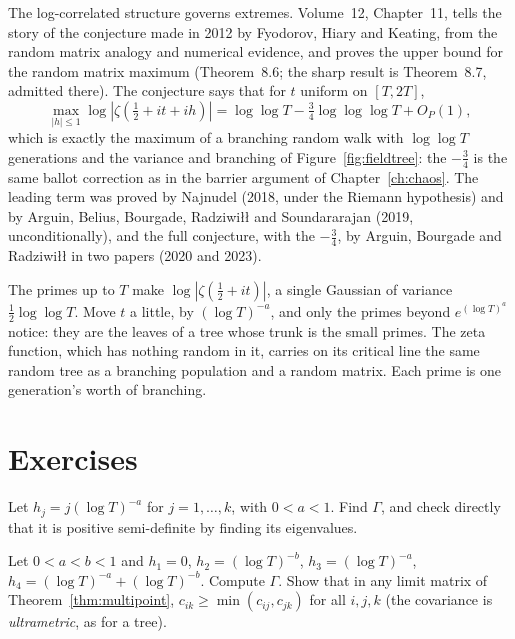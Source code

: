 \begin{remark}\label{rem:fhk}
The log-correlated structure governs extremes. Volume~12, Chapter~11, tells the story of the conjecture made in 2012 by Fyodorov, Hiary and Keating, from the random matrix analogy and numerical evidence, and proves the upper bound for the random matrix maximum (Theorem~8.6; the sharp result is Theorem~8.7, admitted there). The conjecture says that for $t$ uniform on $[T,2T]$,
\[
\max_{|h|\le1}\log|\zeta(\tfrac12+it+ih)|=\log\log T-\tfrac34\log\log\log T+O_P(1),
\]
which is exactly the maximum of a branching random walk with $\log\log T$ generations and the variance and branching of Figure~\ref{fig:fieldtree}: the $-\frac34$ is the same ballot correction as in the barrier argument of Chapter~\ref{ch:chaos}. The leading term was proved by Najnudel (2018, under the Riemann hypothesis) and by Arguin, Belius, Bourgade, Radziwi\l\l{} and Soundararajan (2019, unconditionally), and the full conjecture, with the $-\frac34$, by Arguin, Bourgade and Radziwi\l\l{} in two papers (2020 and 2023).
\end{remark}

\begin{beauty}
The primes up to $T$ make $\log|\zeta(\frac12+it)|$, a single Gaussian of variance $\frac12\log\log T$. Move $t$ a little, by $(\log T)^{-a}$, and only the primes beyond $e^{(\log T)^a}$ notice: they are the leaves of a tree whose trunk is the small primes. The zeta function, which has nothing random in it, carries on its critical line the same random tree as a branching population and a random matrix. Each prime is one generation's worth of branching.
\end{beauty}

\section{Exercises}

\begin{exercise}[$\star$]\label{ex:equicorr}
Let $h_j=j(\log T)^{-a}$ for $j=1,\dots,k$, with $0<a<1$. Find $\Gamma$, and check directly that it is positive semi-definite by finding its eigenvalues.
\end{exercise}

\begin{exercise}[$\star\star$]\label{ex:ultrametric}
Let $0<a<b<1$ and $h_1=0$, $h_2=(\log T)^{-b}$, $h_3=(\log T)^{-a}$, $h_4=(\log T)^{-a}+(\log T)^{-b}$. Compute $\Gamma$. Show that in any limit matrix of Theorem~\ref{thm:multipoint}, $c_{ik}\ge\min(c_{ij},c_{jk})$ for all $i,j,k$ (the covariance is \emph{ultrametric}, as for a tree).
\end{exercise}

